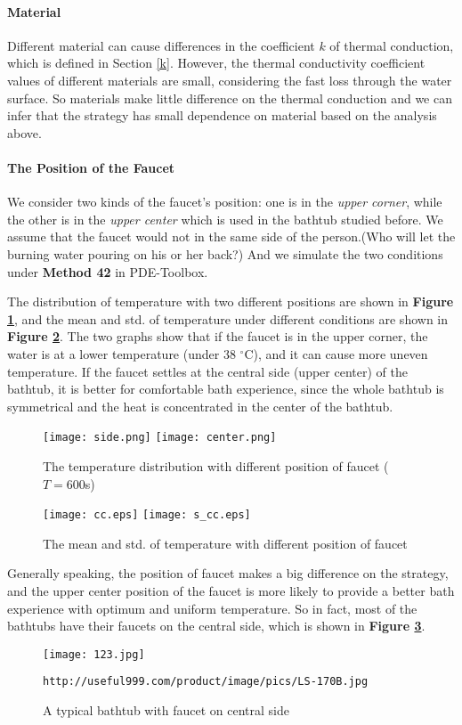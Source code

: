 \documentclass[12pt]{article}
\begin{document}
\paragraph{Material}Different material can cause differences in the coefficient $k$ of thermal
conduction, which is defined in Section \ref{k}. However, the thermal conductivity coefficient
values of different materials are small, considering the fast loss through the water surface. So
materials make little difference on the thermal conduction and we can infer that the strategy has
small dependence on material based on the analysis above.

\paragraph{The Position of the Faucet}We consider two kinds of the faucet's position: one is in the
\emph{upper corner}, while the other is in the \emph{upper center} which is used in the bathtub
studied before. We assume that the faucet would not in the same side of the person.(Who will let the
burning water pouring on his or her back?) And we simulate the two conditions under \textbf{Method
42} in PDE-Toolbox.

The distribution of temperature with two different positions are shown in \textbf{Figure
\ref{center}}, and the mean and std. of temperature under different conditions are shown in
\textbf{Figure \ref{mc}}. The two graphs show that if the faucet is in the upper corner, the water
is at a lower temperature (under 38 $^\circ$C), and it can cause more uneven temperature. If the
faucet settles at the central side (upper center) of the bathtub, it is better for comfortable bath
experience, since the whole bathtub is symmetrical and the heat is concentrated in the center of the
bathtub.
\begin{figure}[!htbp]
\small
\centering
\texttt{[image: side.png]}
\texttt{[image: center.png]}
\caption{The temperature distribution with different position of faucet ($T=600$s)}\label{center}
\end{figure}

\begin{figure}[!htbp]
\small
\centering
\texttt{[image: cc.eps]}
\texttt{[image: s\_cc.eps]}
\caption{The mean and std. of temperature with different position of faucet}\label{mc}
\end{figure}

Generally speaking, the position of faucet makes a big difference on the strategy, and the upper
center position of the faucet is more likely to provide a better bath experience with optimum and
uniform temperature. So in fact, most of the bathtubs have their faucets on the central side, which
is shown in \textbf{Figure \ref{fact}}.
\begin{figure}[!htbp]
\small
\centering
\texttt{[image: 123.jpg]}
\caption{A typical bathtub with faucet on central side}\label{fact}
\texttt{http://useful999.com/product/image/pics/LS-170B.jpg}
\end{figure}
\end{document}
